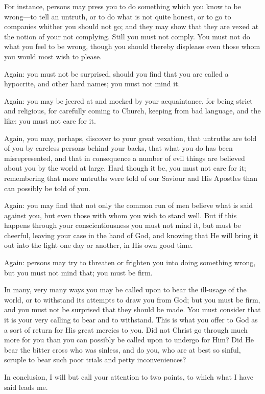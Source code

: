 For instance, persons may press you to do something which you know
to be wrong—to tell an untruth, or to do what is not quite honest,
or to go to companies whither you should not go; and they may show
that they are vexed at the notion of your not complying. Still you
must not comply. You must not do what you feel to be wrong, though you
should thereby displease even those whom you would most wish to
please.

Again: you must not be surprised, should you find that you are
called a hypocrite, and other hard names; you must not mind it.

Again: you may be jeered at and mocked by your acquaintance, for
being strict and religious, for carefully coming to Church, keeping
from bad language, and the like: you must not care for it.

Again, you may, perhaps, discover to your great vexation, that
untruths are told of you by careless persons behind your backs, that
what you do has been misrepresented, and that in consequence a number
of evil things are believed about you by the world at large. Hard
though it be, you must not care for it; remembering that more untruths
were told of our Saviour and His Apostles than can possibly be told of
you.

Again: you may find that not only the common run of men believe
what is said against you, but even those with whom you wish to stand
well. But if this happens through your conscientiousness you must not
mind it, but must be cheerful, leaving your case in the hand of God,
and knowing that He will bring it out into the light one day or
another, in His own good time.

Again: persons may try to threaten or frighten you into doing
something wrong, but you must not mind that; you must be firm.

In many, very many ways you may be called upon to bear the
ill-usage of the world, or to withstand its attempts to draw you from
God; but you must be firm, and you must not be surprised that they
should be made. You must consider that it is your very calling to bear
and to withstand. This is what you offer to God as a sort of return
for His great mercies to you. Did not Christ go through much more for
you than you can possibly be called upon to undergo for Him? Did He
bear the bitter cross who was sinless, and do you, who are at best so
sinful, scruple to bear such poor trials and petty inconveniences?

In conclusion, I will but call your attention to two points, to
which what I have said leads me.

